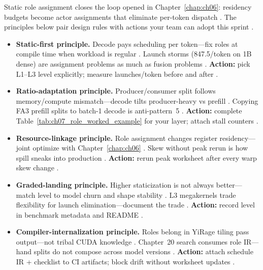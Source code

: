 Static role assignment closes the loop opened in Chapter~\ref{chap:ch06}: residency budgets become actor assignments that eliminate per-token dispatch \citep{yirage2026,shah2024flashattention3,mpk2025,patel2025llminference}.
The principles below pair design rules with actions your team can adopt this sprint \citep{chen2020compilerbasedhardw,taxbreak2026,memoryfloor2026}.

\begin{itemize}
\item \textbf{Static-first principle.}
Decode pays scheduling per token---fix roles at compile time when workload is regular \citep{taxbreak2026,mpk2025,patel2025llminference}.
Launch storms (847.5/token on 1B dense) are assignment problems as much as fusion problems \citep{taxbreak2026}.
\textbf{Action:} pick L1--L3 level explicitly; measure launches/token before and after \citep{nvidia2024cudagraphs,yirage2026}.

\item \textbf{Ratio-adaptation principle.}
Producer/consumer split follows memory/compute mismatch---decode tilts producer-heavy vs prefill \citep{shah2024flashattention3,memoryfloor2026,kwon2023vllm}.
Copying FA3 prefill splits to batch-1 decode is anti-pattern~5 \citep{patel2025llminference,taxbreak2026}.
\textbf{Action:} complete Table~\ref{tab:ch07_role_worked_example} for your layer; attach stall counters \citep{yirage2026}.

\item \textbf{Resource-linkage principle.}
Role assignment changes register residency---joint optimize with Chapter~\ref{chap:ch06} \citep{dao2022flashattention,yirage2026,chen2020compilerbasedhardw}.
Skew without peak rerun is how spill sneaks into production \citep{memoryfloor2026,nvidia2022hopper}.
\textbf{Action:} rerun peak worksheet after every warp skew change \citep{yirage2026,dao2022flashattention}.

\item \textbf{Graded-landing principle.}
Higher staticization is not always better---match level to model churn and shape stability \citep{mpk2025,patel2025llminference,nvidia2024cudagraphs}.
L3 megakernels trade flexibility for launch elimination---document the trade \citep{taxbreak2026,wu2024mirage}.
\textbf{Action:} record level in benchmark metadata and README \citep{taxbreak2026,yirage2026}.

\item \textbf{Compiler-internalization principle.}
Roles belong in YiRage tiling pass output---not tribal CUDA knowledge \citep{yirage2026,wu2024mirage,mpk2025}.
Chapter~20 search consumes role IR---hand splits do not compose across model versions \citep{wu2024mirage,chen2020compilerbasedhardw,patel2025llminference}.
\textbf{Action:} attach schedule IR + checklist to CI artifacts; block drift without worksheet updates \citep{yirage2026,shah2024flashattention3,taxbreak2026}.
\end{itemize}

